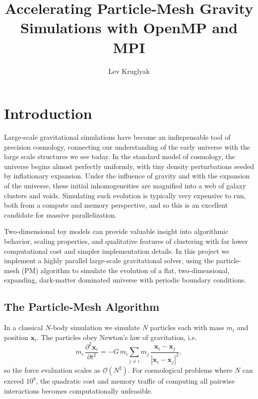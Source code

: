 \documentclass{lkx_paper}
\title{Accelerating Particle-Mesh Gravity\\ Simulations with OpenMP and MPI}
\author{Lev Kruglyak}
\begin{document}
\section{Introduction}

Large-scale gravitational simulations have become an indispensable tool of precision cosmology, connecting our understanding of the early universe with the large scale structures we see today. In the standard model of cosmology, the universe begins almost perfectly uniformly, with tiny density perturbations seeded by inflationary expansion. Under the influence of gravity and with the expansion of the universe, these initial inhomogeneities are magnified into a web of galaxy clusters and voids.
Simulating such evolution is typically very expensive to run, both from a compute and memory perspective, and so this is an excellent candidate for massive parallelization.

Two‑dimensional toy models can provide valuable insight into algorithmic behavior, scaling properties, and qualitative features of clustering with far lower computational cost and simpler implementation details. In this project we implement a highly parallel large-scale gravitational solver, using the particle-mesh (PM) algorithm to simulate the evolution of a flat, two-dimensional, expanding, dark-matter dominated universe with periodic boundary conditions.

\subsection{The Particle-Mesh Algorithm}

In a classical $N$-body simulation we simulate $N$ particles each with mass $m_i$ and position $\bm{x}_i$. The particles obey Newton’s law of gravitation, i.e.
\[
  m_i\,\frac{\partial^2\bm{x}_i}{\partial t^2}
  =
  -G\,m_i \sum_{j\neq i}
  m_j\,\frac{\bm{x}_i-\bm{x}_j}{|\bm{x}_i-\bm{x}_j|^{3}},
\]
so the force evaluation scales as $\mathcal{O}(N^2)$.  For cosmological problems where $N$ can exceed $10^{8}$, the quadratic cost and memory traffic of computing all pairwise interactions becomes computationally unfeasible.
\end{document}
